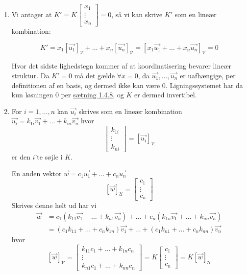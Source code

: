 \begin{bevis}
	\begin{enumerate}
		\item Vi antager at $K' = K\begin{bmatrix}x_1\\ \vdots 
			\\x_n\end{bmatrix} = 0$, så vi kan skrive $K'$ som en lineær 
			kombination:

			\[
				K' = x_1[\vec{u_1}]_{\mathcal{V}} + \ldots + 
					x_n[\vec{u_n}]_{\mathcal{V}} = [x_1\vec{u_1} + \ldots + 
					x_n\vec{u_n}]_{\mathcal{V}} = 0
			\]
			
			Hvor det sidste lighedstegn kommer af at koordinatisering bevarer
			lineær struktur.
			Da $K' = 0$ må det gælde $\forall x = 0$, da $\vec{u_1}, \ldots, 
			\vec{u_n}$ er uafhængige, per definitionen af en basis, og dermed 
			ikke kan være 0. 
			Ligningssystemet har da kun løsningen $0$ per 
			\hyperlink{1.4.8}{sætning 1.4.8}, og $K$ er dermed invertibel.
		\item For $i = 1,\dots,n$ kan $\vec{u_i}$ skrives som en lineær kombination
			$\vec{u_i} = k_{1i} \vec{v_1}+\dots + k_{ni} \vec{v_n}$ hvor
			\[
				\begin{bmatrix}
					k_{1i} \\
					\vdots \\
					k_{ni}
				\end{bmatrix} = [ \vec{u_i} ]_\mathcal{V}
			\]
			er den $i$'te søjle i $K$.

			En anden vektor $\vec{w} = c_1 \vec{u_1} + \dots + c_n \vec{u_n}$ 
			\[
				[ \vec{w} ]_\mathcal{U} = \begin{bmatrix}
					c_{1} \\
					\vdots \\
					c_{n}
				\end{bmatrix}
			\]
			Skrives denne helt ud har vi
			\begin{align*}
				\vec{w} &= c_1 (k_{11} \vec{v_1} + \dots + k_{n1} \vec{v_n}) + \dots + c_n
						(k_{1n} \vec{v_1} + \dots + k_{nn} \vec{v_n}) \\
					&= (c_1 k_{11} + \dots + c_n k_{1n}) \vec{v_1} + \dots + (c_1 k_{n1} +
						\dots + c_n k_{nn}) \vec{v_n}
			\end{align*}
			hvor
			\[
				[ \vec{w} ]_\mathcal{V} = \begin{bmatrix}
					k_{11} c_1 + \dots + k_{1n} c_n \\
					\vdots \\
					k_{n1} c_1 + \dots + k_{nn} c_n
				\end{bmatrix} = K \begin{bmatrix}
					c_1 \\
					\vdots \\
					c_n
				\end{bmatrix} = K[\vec{w}]_\mathcal{U}
			\]


\end{enumerate}
\end{bevis}
